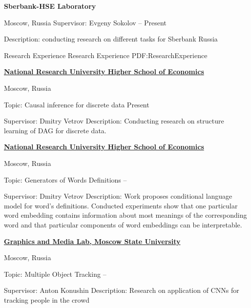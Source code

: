 \documentclass[letterpaper,MMMyyyy,nonstopmode]{simpleresumecv}
\begin{document}
\begin{Body}
\Gap

\Entry
\textbf{Sberbank-HSE Laboratory}
\par
Moscow, Russia
\BulletItem
Supervisor: Evgeny Sokolov
\hfill
{} --
Present
\begin{Detail}
\SubBulletItem
Description: conducting research on different tasks for Sberbank Russia
\end{Detail}


\Section
{Research Experience}
{Research Experience}
{PDF:ResearchExperience}

\Entry
\href{https://www.hse.ru/en/}
{\textbf{National Research University Higher School of Economics}}
\par
Moscow, Russia

\Gap
\BulletItem
Topic: Causal inference for discrete data
\hfill
Present
\begin{Detail}
\SubBulletItem
Supervisor:
Dmitry Vetrov
\SubBulletItem
Description:
Conducting research on structure learning of DAG for discrete data.
\end{Detail}

\Entry
\href{https://www.hse.ru/en/}
{\textbf{National Research University Higher School of Economics}}
\par
Moscow, Russia

\Gap
\BulletItem
Topic: Generators of Words Definitions
\hfill
{} --
\begin{Detail}
\SubBulletItem
Supervisor:
Dmitry Vetrov
\SubBulletItem
Description:
Work proposes conditional language model for word’s definitions. \newline
Conducted experiments show that one particular word embedding contains \newline
information about most meanings of the corresponding word and that \newline
particular components of word embeddings can be interpretable.
\end{Detail}

\Gap

\Entry
\href{http://graphics.cs.msu.ru/en}
{\textbf{Graphics and Media Lab, Moscow State University}}
\par
Moscow, Russia

\Gap
\BulletItem
Topic: Multiple Object Tracking
\hfill
{} --
\begin{Detail}
\SubBulletItem
Supervisor:
Anton Konushin
\SubBulletItem
Description:
Research on application of CNNs for tracking people in the crowd
\end{Detail}


\end{Body}
\end{document}
